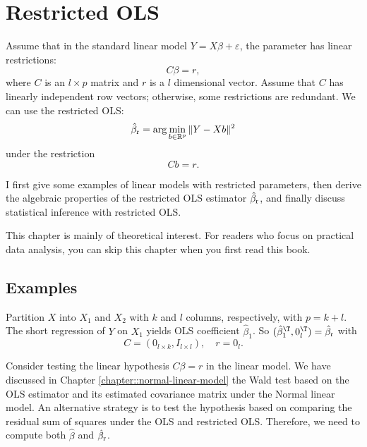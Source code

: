  
\chapter{Restricted OLS}
 \label{chapter::rols}
  



Assume that in the standard linear model $Y=X\beta  + \varepsilon$, the parameter has linear restrictions:
\begin{equation}
\label{eq::rOLS-restriction}
C \beta = r , 
\end{equation}
where $C $ is an $l\times p$ matrix and $r$ is a $l$ dimensional vector. Assume that $C $ has linearly independent row vectors; otherwise, some restrictions are redundant. 
We can use the  restricted OLS:  
$$
\hat\beta_\textup{r} = 
\arg \min_{b\in \mathbb{R}^p }  \|  Y - Xb \|^2
$$
under the restriction 
$$
C  b = r . 
$$

I first give some examples of linear models with restricted parameters, then derive the algebraic properties of the restricted OLS estimator $\hat\beta_\textup{r} $, and finally discuss statistical inference with restricted OLS. 

This chapter is mainly of theoretical interest. For readers who focus on practical data analysis, you can skip this chapter when you first read this book. 





\section{Examples}


\begin{example}\label{eg::short-regression-rols}
Partition $X$ into $X_1$ and $X_2$ with $k$ and $l$ columns, respectively, with $p = k+l$. The short regression of $Y$ on $X_1$ yields OLS coefficient $\hat\beta_1$. So $(\hat\beta_1^{\T}, 0_l^{\T}) = \hat\beta_\textup{r} $ with 
$$
C  = (0_{l\times k}, I_{l\times l}),\quad r=0_l. 
$$
\end{example}




\begin{example}\label{eg::test-linear-hypothesis-rols}
Consider testing the linear hypothesis $C \beta = r$ in the linear model. We have discussed in Chapter \ref{chapter::normal-linear-model} the Wald test based on the OLS estimator and its estimated covariance matrix under the Normal linear model. An alternative strategy is to test the hypothesis based on comparing the residual sum of squares under the OLS and restricted OLS. Therefore, we need to compute both $\hat\beta$ and $\hat\beta_\textup{r} $. 
\end{example}





